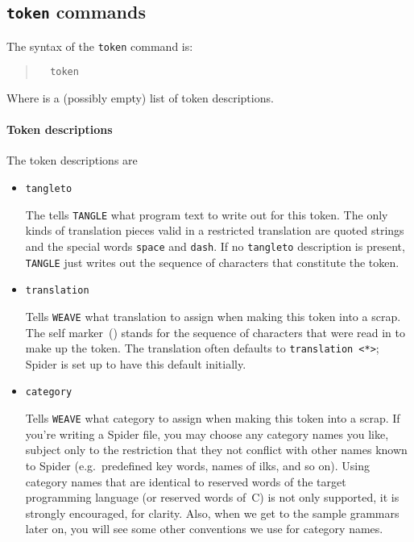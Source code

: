 \subsection{{\tt token} commands}
The syntax of the {\tt token} command is:
\begin{quote}
\tt  
{} \produces~token 
\end{quote}
Where  is a (possibly empty) list of token
descriptions.

\paragraph{Token descriptions}
The token descriptions are
\begin{itemize}\parindent=0pt
\item
{\tt tangleto }

The  tells {\tt TANGLE} what program
text to write out for this token.
The only kinds of translation pieces valid in a restricted translation
are quoted strings and the special words {\tt space} and {\tt dash}.
If no {\tt tangleto} description is present, {\tt TANGLE} just writes
out the sequence of characters that constitute the token.

\item
{\tt translation }

Tells {\tt WEAVE} what translation to assign when making this token into
a scrap.
The self
marker~({\tt*}) stands for the sequence of characters that were read in to
make up the token.
The translation often defaults to \verb+translation <*>+; {Spider}
is set up to have this default initially.

\item
{\tt category }

Tells {\tt WEAVE}  what category to assign when making this token into
a scrap.
If you're writing a {Spider} file, you may choose any category
names you like, subject only to the restriction that they not conflict
with other names  known to {Spider} (e.g.~predefined key words,
names of ilks, and so on).
Using category names that are identical to reserved words of the
target programming language (or reserved words of~C) is not only
supported, it is strongly encouraged, for clarity.
Also, when we get to the sample grammars later on, you will see some
other conventions we use for category names.


\end{itemize}
